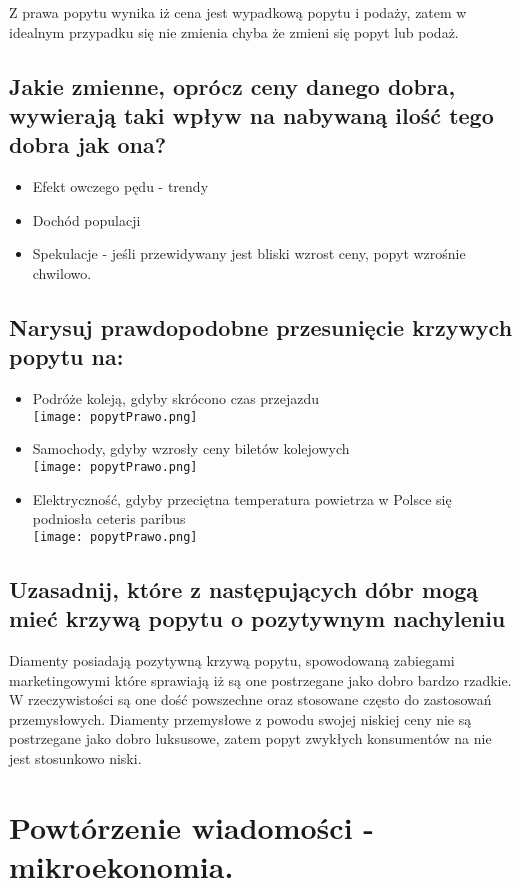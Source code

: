 \documentclass[a4paper,12pt]{article}
\newcommand{\popytPrawo}{\\\texttt{[image: popytPrawo.png]}}
\let\oldsection\section
\renewcommand\section{\clearpage\oldsection}
\begin{document}
Z prawa popytu wynika iż cena jest wypadkową popytu i podaży, zatem w idealnym przypadku się nie zmienia chyba że zmieni się popyt lub podaż.

\subsection{Jakie zmienne, oprócz ceny danego dobra, wywierają taki wpływ na nabywaną ilość tego dobra jak ona?}

\begin{itemize}
	\item Efekt owczego pędu - trendy
	\item Dochód populacji
	\item Spekulacje - jeśli przewidywany jest bliski wzrost ceny, popyt wzrośnie chwilowo.
\end{itemize}

\subsection{Narysuj prawdopodobne przesunięcie krzywych popytu na:}

\begin{itemize}
	\item Podróże koleją, gdyby skrócono czas przejazdu \popytPrawo
	\item Samochody, gdyby wzrosły ceny biletów kolejowych \popytPrawo
	\item Elektryczność, gdyby przeciętna temperatura powietrza w Polsce się podniosła ceteris paribus \popytPrawo
\end{itemize}

\subsection{Uzasadnij, które z następujących dóbr mogą mieć krzywą popytu o pozytywnym nachyleniu}

Diamenty posiadają pozytywną krzywą popytu, spowodowaną zabiegami marketingowymi które sprawiają iż są one postrzegane jako dobro bardzo rzadkie. W rzeczywistości są one dość powszechne oraz stosowane często do zastosowań przemysłowych. Diamenty przemysłowe z powodu swojej niskiej ceny nie są postrzegane jako dobro luksusowe, zatem popyt zwykłych konsumentów na nie jest stosunkowo niski.

\section{Powtórzenie wiadomości - mikroekonomia.}
\end{document}
